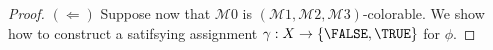 \begin{proof}
  $(\Leftarrow)$
  Suppose now that $\mathcal{M}{0}$ is $(\mathcal{M}{1}, \mathcal{M}{2}, \mathcal{M}{3})$-colorable.
  We show how to construct a satifsying assignment
  $\gamma : X \to \{\FALSE, \TRUE\}$ for $\phi$.


  

  


\end{proof}
